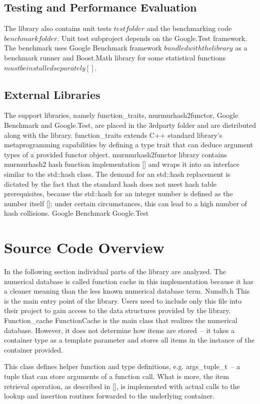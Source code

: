 \subsection{Testing and Performance Evaluation}
The library also contains unit tests \(test folder\) and the benchmarking code \(benchmark folder\). Unit test subproject depends on the Google.Test framework. The benchmark uses Google Benchmark framework \(bundled with the library\) as a benchmark runner and Boost.Math library for some statistical functions \(must be installed separately []\).

\subsection{External Libraries}
The support libraries, namely function\_traits, murmurhash2functor, Google Benchmark and Google.Test, are placed in the 3rdparty folder and are distributed along with the library.
function\_traits extends C++ standard library’s metaprogramming capabilities by defining a type trait that can deduce argument types of a provided functor object.
murmurhash2functor library contains murmurhash2 hash function implementation [] and wraps it into an interface similar to the std::hash class. The demand for an std::hash replacement is dictated by the fact that the standard hash does not meet hash table prerequisites, because the std::hash for an integer number is defined as the number itself []; under certain circumstances, this can lead to a high number of hash collisions.
Google Benchmark
Google.Test



\section{Source Code Overview}
In the following section individual parts of the library are analyzed. The numerical database is called function cache in this implementation because it has a cleaner meaning than the less known numerical database term.
Numdb.h
This is the main entry point of the library. Users need to include only this file into their project to gain access to the data structures provided by the library.
Function\_cache
FunctionCache is the main class that realizes the numerical database. However, it does not determine how items are stored~-- it takes a container type as a template parameter and stores all items in the instance of the container provided.

This class defines helper function and type definitions, e.g. args\_tuple\_t~-- a tuple that can store arguments of a function call. What is more, the item retrieval operation, as described in [], is implemented with actual calls to the lookup and insertion routines forwarded to the underlying container.

